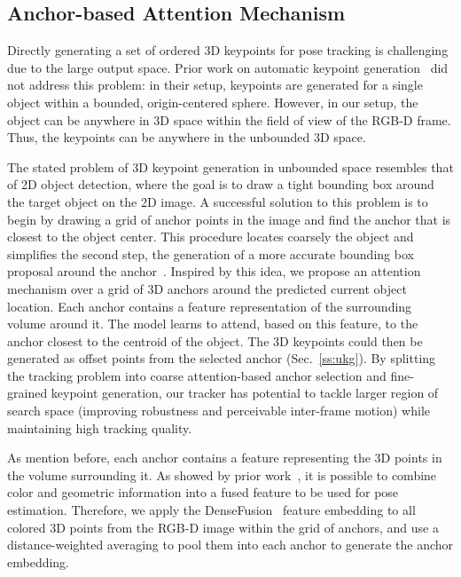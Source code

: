 \documentclass[letterpaper, 10 pt, conference]{ieeeconf}
\begin{document}
\subsection{Anchor-based Attention Mechanism}
\label{ss:abam}

Directly generating a set of ordered 3D keypoints for pose tracking is challenging due to the large output space. Prior work on automatic keypoint generation~\cite{suwajanakorn2018discovery} did not address this problem: in their setup, keypoints are generated for a single object within a bounded, origin-centered sphere. However, in our setup, the object can be anywhere in 3D space within the field of view of the RGB-D frame. Thus, the keypoints can be anywhere in the unbounded 3D space. 

The stated problem of 3D keypoint generation in unbounded space resembles that of 2D object detection, where the goal is to draw a tight bounding box around the target object on the 2D image. A successful solution to this problem is to begin by drawing a grid of anchor points in the image and find the anchor that is closest to the object center. This procedure locates coarsely the object and simplifies the second step, the generation of a more accurate bounding box proposal around the anchor~\cite{redmon2016you}. Inspired by this idea, we propose an attention mechanism over a grid of 3D anchors around the predicted current object location. Each anchor contains a feature representation of the surrounding volume around it. The model learns to attend, based on this feature, to the anchor closest to the centroid of the object. The 3D keypoints could then be generated as offset points from the selected anchor (Sec.~\ref{ss:ukg}). By splitting the tracking problem into coarse attention-based anchor selection and fine-grained keypoint generation, our tracker has potential to tackle larger region of search space (improving robustness and perceivable inter-frame motion) while maintaining high tracking quality.

As mention before, each anchor contains a feature representing the 3D points in the volume surrounding it. As showed by prior work~\cite{wang2019densefusion}, it is possible to combine color and geometric information into a fused feature to be used for pose estimation. Therefore, we apply the DenseFusion~\cite{wang2019densefusion} feature embedding to all colored 3D points from the RGB-D image within the grid of anchors, and use a distance-weighted averaging to pool them into each anchor to generate the anchor embedding.
\end{document}
